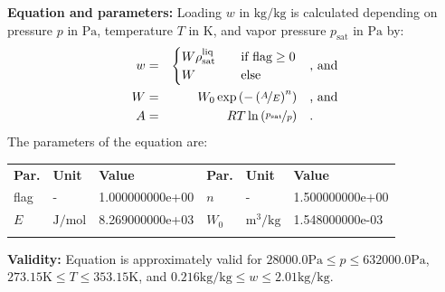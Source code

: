 \textbf{Equation and parameters:}
\newline
%
Loading $w$ in $\si{\kilogram\per\kilogram}$ is calculated depending on pressure $p$ in $\si{\pascal}$, temperature $T$ in $\si{\kelvin}$, and vapor pressure $p_\mathrm{sat}$ in $\si{\pascal}$ by:
%
\begin{equation*}
\begin{split}
w &=& \begin{cases} W \rho_\mathrm{sat}^{\mathrm{liq}} & \quad \text{if flag} \geq 0 \\ W & \quad \text{else} \end{cases} & \quad\text{, and} \\
W &=& W_0 \exp \left( - \left( \nicefrac{A}{E} \right) ^{n} \right) & \quad\text{, and} \\
A &=& R T \ln \left( \nicefrac{p_\mathrm{sat}}{p} \right) & \quad\text{.} \\
\end{split}
\end{equation*}
%
The parameters of the equation are:
%
\begin{longtable}[l]{lll|lll}
\toprule
\addlinespace
\textbf{Par.} & \textbf{Unit} & \textbf{Value} &	\textbf{Par.} & \textbf{Unit} & \textbf{Value} \\
\addlinespace
\midrule
\endhead

\bottomrule
\endfoot
\bottomrule
\endlastfoot
\addlinespace

flag & - & 1.000000000e+00 & $n$ & - & 1.500000000e+00 \\
$E$ & $\si{\joule\per\mole}$ & 8.269000000e+03 & $W_0$ & $\si{\cubic\meter\per\kilogram}$ & 1.548000000e-03 \\

\addlinespace\end{longtable}

\textbf{Validity:}
\newline
Equation is approximately valid for $28000.0 \si{\pascal} \leq p \leq 632000.0 \si{\pascal}$,  $273.15 \si{\kelvin} \leq T \leq 353.15 \si{\kelvin}$, and $0.216 \si{\kilogram\per\kilogram} \leq w \leq 2.01 \si{\kilogram\per\kilogram}$.
\newline

